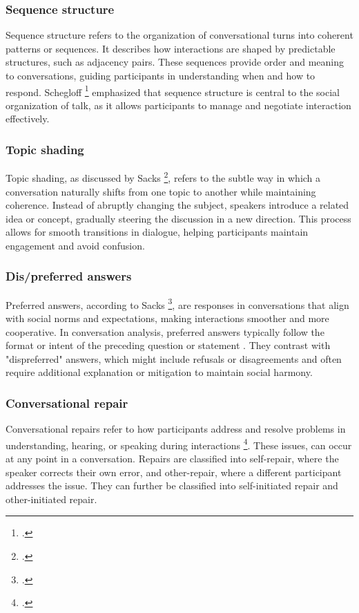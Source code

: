 \documentclass[12pt]{report}
\begin{document}
{    \subsubsection{Sequence structure}
    \par
    Sequence structure refers to the organization of conversational turns into coherent patterns or sequences. It describes how interactions are shaped by predictable structures, such as adjacency pairs. These sequences provide order and meaning to conversations, guiding participants in understanding when and how to respond. Schegloff \footcite{Schegloff1990} emphasized that sequence structure is central to the social organization of talk, as it allows participants to manage and negotiate interaction effectively.

    \subsubsection{Topic shading}
    \par
    Topic shading, as discussed by Sacks \footcite{topicshading}, refers to the subtle way in which a conversation naturally shifts from one topic to another while maintaining coherence. Instead of abruptly changing the subject, speakers introduce a related idea or concept, gradually steering the discussion in a new direction. This process allows for smooth transitions in dialogue, helping participants maintain engagement and avoid confusion.

    \subsubsection{Dis/preferred answers}
    \par
    Preferred answers, according to Sacks \footcite[p.~410]{Sacks1992}, are responses in conversations that align with social norms and expectations, making interactions smoother and more cooperative. In conversation analysis, preferred answers typically follow the format or intent of the preceding question or statement . They contrast with "dispreferred" answers, which might include refusals or disagreements and often require additional explanation or mitigation to maintain social harmony.

    \subsubsection{Conversational repair}
    \par
    Conversational repairs refer to how participants address and resolve problems in understanding, hearing, or speaking during interactions \footcite{sacksRepair}. These issues, can occur at any point in a conversation. Repairs are classified into self-repair, where the speaker corrects their own error, and other-repair, where a different participant addresses the issue. They can further be classified into self-initiated repair and other-initiated repair.

}
\end{document}
